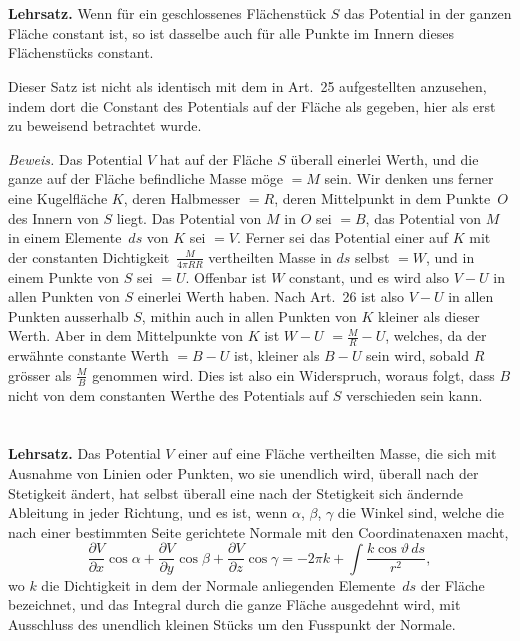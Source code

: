 \documentclass[12pt,a4paper]{article}
\begin{document}
\section{}
\textbf{Lehrsatz.} Wenn für ein geschlossenes Flächenstück $S$ das Potential in
der ganzen Fläche constant ist, so ist dasselbe auch für alle Punkte im Innern
dieses Flächenstücks constant.

Dieser Satz ist nicht als identisch mit dem in Art.~25 aufgestellten anzusehen,
indem dort die Constant des Potentials auf der Fläche als gegeben, hier als erst
zu beweisend betrachtet wurde.

\textit{Beweis.} Das Potential $V$ hat auf der Fläche $S$ überall einerlei Werth,
und die ganze auf der Fläche befindliche Masse möge $=M$ sein. Wir denken
uns ferner eine Kugelfläche $K$, deren Halbmesser $=R$, deren Mittelpunkt in dem
Punkte~$O$ des Innern von $S$ liegt. Das Potential von $M$ in $O$ sei $=B$, das
Potential von $M$ in einem Elemente~$ds$ von $K$ sei $=V$. Ferner sei das Potential
einer auf $K$ mit der constanten Dichtigkeit~$\tfrac{M}{4\pi RR}$ vertheilten Masse in $ds$ selbst
$=W$, und in einem Punkte von $S$ sei $=U$. Offenbar ist $W$ constant, und es
wird also $V-U$ in allen Punkten von $S$ einerlei Werth haben. Nach Art.~26
ist also $V-U$ in allen Punkten ausserhalb $S$, mithin auch in allen Punkten
von $K$ kleiner als dieser Werth. Aber in dem Mittelpunkte von $K$ ist $W-U$
$=\tfrac{M}{R}-U$, welches, da der erwähnte constante Werth $=B-U$ ist, kleiner als
$B-U$ sein wird, sobald $R$ grösser als $\tfrac{M}{B}$ genommen wird. Dies ist also ein
Widerspruch, woraus folgt, dass $B$ nicht von dem constanten Werthe des Potentials
auf $S$ verschieden sein kann.

\section{}
\textbf{Lehrsatz.} Das Potential $V$ einer auf eine Fläche vertheilten Masse,
die sich mit Ausnahme von Linien oder Punkten, wo sie unendlich wird, überall
nach der Stetigkeit ändert, hat selbst überall eine nach der Stetigkeit sich ändernde
Ableitung in jeder Richtung, und es ist, wenn $\alpha$, $\beta$, $\gamma$ die Winkel sind, welche die
nach einer bestimmten Seite gerichtete Normale mit den Coordinatenaxen macht,
\[
\frac{\partial V}{\partial x}\cos\alpha
+\frac{\partial V}{\partial y}\cos\beta
+\frac{\partial V}{\partial z}\cos\gamma
= -2\pi k + \int\frac{k\cos\vartheta\,ds}{r^2},
\]
wo $k$ die Dichtigkeit in dem der Normale anliegenden Elemente~$ds$ der Fläche
bezeichnet, und das Integral durch die ganze Fläche ausgedehnt wird, mit Ausschluss
des unendlich kleinen Stücks um den Fusspunkt der Normale.
\end{document}

